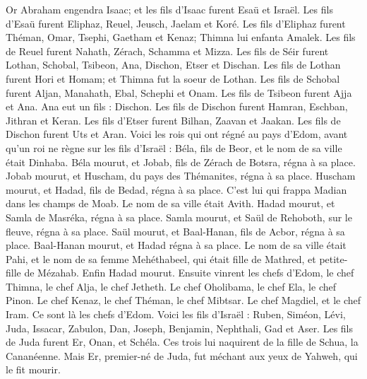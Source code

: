 \begin{multicols}{2}
Or Abraham engendra Isaac; et les fils d'Isaac furent  Esaü et Israël.
Les fils d’Esaü furent  Eliphaz, Reuel, Jeusch, Jaelam et Koré.
Les fils d’Eliphaz furent Théman, Omar, Tsephi, Gaetham et Kenaz; Thimna lui enfanta Amalek.
Les fils de Reuel furent Nahath, Zérach, Schamma et Mizza.
Les fils de Séir furent Lothan, Schobal, Tsibeon, Ana, Dischon, Etser et Dischan.
Les fils de Lothan furent  Hori et Homam; et Thimna fut la soeur de Lothan.
Les fils de Schobal furent Aljan, Manahath, Ebal, Schephi et Onam. Les fils de Tsibeon furent Ajja et Ana.
Ana eut un fils : Dischon.  Les fils de Dischon furent Hamran, Eschban, Jithran et Keran.
Les fils d’Etser furent Bilhan, Zaavan et Jaakan. Les fils de Dischon furent Uts et Aran.
Voici les rois qui ont régné au pays d'Edom, avant qu’un roi ne règne sur les fils d’Israël : Béla, fils de Beor, et le nom de sa ville était Dinhaba.
Béla mourut, et Jobab, fils de Zérach de Botsra, régna à sa place.
Jobab mourut, et Huscham, du pays des Thémanites, régna à sa place.
Huscham mourut, et Hadad, fils de Bedad, régna à sa place. C’est lui qui frappa Madian dans les champs de Moab. Le nom de sa ville était Avith.
Hadad mourut, et Samla de Masréka, régna à sa place.
Samla mourut, et Saül de Rehoboth, sur le fleuve, régna à sa place.
Saül mourut, et Baal-Hanan, fils de Acbor, régna à sa place.
Baal-Hanan mourut, et Hadad régna à sa place. Le nom de sa ville était Pahi, et le nom de sa femme Mehéthabeel, qui était fille de Mathred, et petite- fille de Mézahab.
Enfin Hadad mourut. Ensuite vinrent les chefs d'Edom, le chef Thimna, le chef Alja, le chef Jetheth.
Le chef Oholibama, le chef Ela, le chef Pinon.
Le chef Kenaz, le chef Théman, le chef Mibtsar.
Le chef Magdiel, et le chef Iram. Ce sont là les chefs d'Edom.
\VerseOne{}Voici les fils d'Israël : Ruben, Siméon, Lévi, Juda, Issacar, Zabulon,
Dan, Joseph, Benjamin, Nephthali, Gad et Aser.
Les fils de Juda furent  Er, Onan, et Schéla. Ces trois lui naquirent de la fille de Schua, la Cananéenne. Mais Er, premier-né de Juda, fut méchant aux yeux de Yahweh, qui le fit mourir.

\end{multicols}
